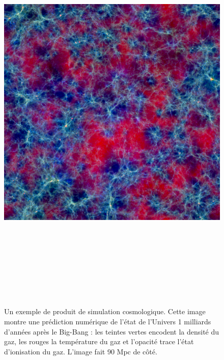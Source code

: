 \begin{figure}[htbp]
	\centering
		\includegraphics[height=20cm]{figs/simuemma.jpg}
	\caption[Un exemple de produit de simulation cosmologique]{Un exemple de produit de simulation cosmologique. Cette image montre une prédiction numérique de l'état de l'Univers 1 milliards d'années après le Big-Bang : les teintes vertes encodent la densité du gaz, les rouges la température du gaz et l'opacité trace l'état d'ionisation du gaz. L'image fait 90 Mpc de côté.}
	\label{f:simuemma}
\end{figure}

